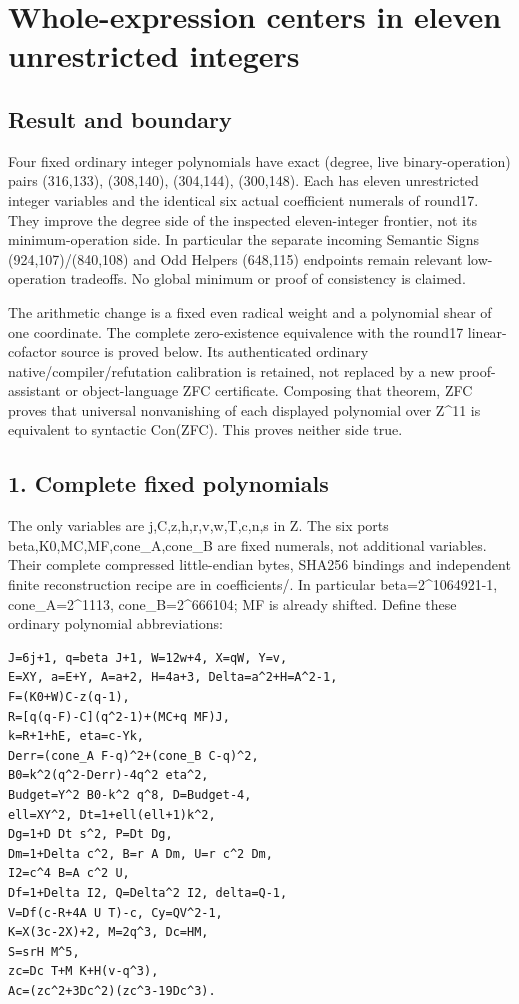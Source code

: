 \section{Whole-expression centers in eleven unrestricted integers}

\subsection{Result and boundary}

Four fixed ordinary integer polynomials have exact (degree, live binary-operation)
pairs (316,133), (308,140), (304,144), (300,148). Each has eleven unrestricted
integer variables and the identical six actual coefficient numerals of round17.
They improve the degree side of the inspected eleven-integer frontier, not its
minimum-operation side. In particular the separate incoming Semantic Signs
(924,107)/(840,108) and Odd Helpers (648,115) endpoints remain relevant
low-operation tradeoffs. No global minimum or proof of consistency is claimed.

The arithmetic change is a fixed even radical weight and a polynomial shear of
one coordinate. The complete zero-existence equivalence with the round17
linear-cofactor source is proved below. Its authenticated ordinary
native/compiler/refutation calibration is retained, not replaced by a new
proof-assistant or object-language ZFC certificate. Composing that theorem,
ZFC proves that universal nonvanishing of each displayed polynomial over Z\textasciicircum{}11
is equivalent to syntactic Con(ZFC). This proves neither side true.

\subsection{1. Complete fixed polynomials}

The only variables are j,C,z,h,r,v,w,T,c,n,s in Z. The six ports
beta,K0,MC,MF,cone\_A,cone\_B are fixed numerals, not additional variables.
Their complete compressed little-endian bytes, SHA256 bindings and independent
finite reconstruction recipe are in coefficients/. In particular
beta=2\textasciicircum{}1064921-1, cone\_A=2\textasciicircum{}1113, cone\_B=2\textasciicircum{}666104; MF is already shifted.
Define these ordinary polynomial abbreviations:

\begingroup\small
\begin{verbatim}
J=6j+1, q=beta J+1, W=12w+4, X=qW, Y=v,
E=XY, a=E+Y, A=a+2, H=4a+3, Delta=a^2+H=A^2-1,
F=(K0+W)C-z(q-1),
R=[q(q-F)-C](q^2-1)+(MC+q MF)J,
k=R+1+hE, eta=c-Yk,
Derr=(cone_A F-q)^2+(cone_B C-q)^2,
B0=k^2(q^2-Derr)-4q^2 eta^2,
Budget=Y^2 B0-k^2 q^8, D=Budget-4,
ell=XY^2, Dt=1+ell(ell+1)k^2,
Dg=1+D Dt s^2, P=Dt Dg,
Dm=1+Delta c^2, B=r A Dm, U=r c^2 Dm,
I2=c^4 B=A c^2 U,
Df=1+Delta I2, Q=Delta^2 I2, delta=Q-1,
V=Df(c-R+4A U T)-c, Cy=QV^2-1,
K=X(3c-2X)+2, M=2q^3, Dc=HM,
S=srH M^5,
zc=Dc T+M K+H(v-q^3),
Ac=(zc^2+3Dc^2)(zc^3-19Dc^3).
\end{verbatim}
\endgroup

